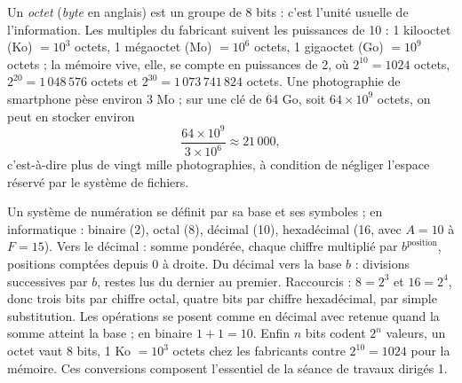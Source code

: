 \begin{exemple}
Un \emph{octet} (\emph{byte} en anglais) est un groupe de 8 bits : c'est l'unité usuelle de l'information. Les multiples du fabricant suivent les puissances de 10 : 1 kilooctet (Ko) $= 10^{3}$ octets, 1 mégaoctet (Mo) $= 10^{6}$ octets, 1 gigaoctet (Go) $= 10^{9}$ octets ; la mémoire vive, elle, se compte en puissances de 2, où $2^{10} = 1024$ octets, $2^{20} = 1\,048\,576$ octets et $2^{30} = 1\,073\,741\,824$ octets. Une photographie de smartphone pèse environ 3 Mo ; sur une clé de 64 Go, soit $64 \times 10^{9}$ octets, on peut en stocker environ
\[
\frac{64 \times 10^{9}}{3 \times 10^{6}} \approx 21\,000 ,
\]
c'est-à-dire plus de vingt mille photographies, à condition de négliger l'espace réservé par le système de fichiers.
\end{exemple}

\begin{aretirer}
Un système de numération se définit par sa base et ses symboles ; en informatique : binaire (2), octal (8), décimal (10), hexadécimal (16, avec $A{=}10$ à $F{=}15$). Vers le décimal : somme pondérée, chaque chiffre multiplié par $b^{\text{position}}$, positions comptées depuis 0 à droite. Du décimal vers la base $b$ : divisions successives par $b$, restes lus du dernier au premier. Raccourcis : $8 = 2^{3}$ et $16 = 2^{4}$, donc trois bits par chiffre octal, quatre bits par chiffre hexadécimal, par simple substitution. Les opérations se posent comme en décimal avec retenue quand la somme atteint la base ; en binaire $1+1 = 10$. Enfin $n$ bits codent $2^{n}$ valeurs, un octet vaut 8 bits, 1 Ko $= 10^{3}$ octets chez les fabricants contre $2^{10} = 1024$ pour la mémoire. Ces conversions composent l'essentiel de la séance de travaux dirigés 1.
\end{aretirer}
